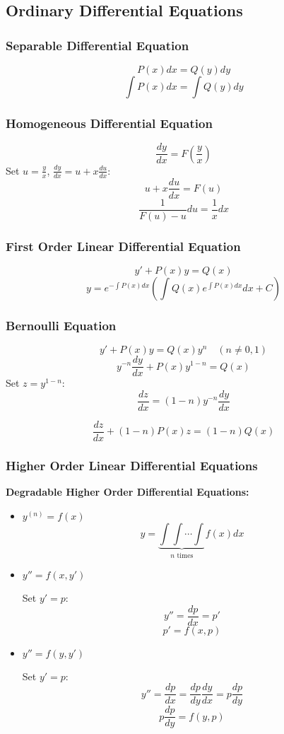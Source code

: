 \documentclass{article}
\begin{document}
\subsection{Ordinary Differential Equations}

\subsubsection{Separable Differential Equation}

\[
    P(x) dx = Q(y) dy
\]
\[
    \int P(x) dx = \int Q(y) dy
\]

\subsubsection{Homogeneous Differential Equation}

\[
    \frac{dy}{dx} = F\left(\frac{y}{x}\right)
\]
Set $u = \frac{y}{x}$, $\frac{dy}{dx} = u + x\frac{du}{dx}$:
\[
    u + x\frac{du}{dx} = F(u)
\]
\[
    \frac{1}{F(u) - u} du = \frac{1}{x} dx
\]

\subsubsection{First Order Linear Differential Equation}

\[
    y' + P(x)y = Q(x)
\]
\[
    y = e^{-\int P(x) dx} \left(\int Q(x) e^{\int P(x) dx} dx + C\right)
\]

\subsubsection{Bernoulli Equation}

\[
    y' + P(x)y = Q(x)y^n \quad (n \neq 0, 1)
\]
\[
    y^{-n} \frac{dy}{dx} + P(x) y^{1-n} = Q(x)
\]
Set $z = y^{1-n}$:
\[
    \frac{dz}{dx} = (1-n) y^{-n} \frac{dy}{dx}
\]

\[
    \frac{dz}{dx} + (1-n)P(x)z = (1-n)Q(x)
\]

\subsubsection{Higher Order Linear Differential Equations}

\textbf{Degradable Higher Order Differential Equations:}

\begin{itemize}
    \item $y^{(n)} = f(x)$
    \[
        y = \underbrace{\int \int \cdots \int}_{n \text{ times}} f(x) dx
    \]

    \item $y'' = f(x, y')$

    Set $y' = p$:
    \[
        y'' = \frac{dp}{dx} = p'
    \]
    \[
        p' = f(x, p)
    \]

    \item $y'' = f(y, y')$

    Set $y' = p$:
    \[
        y'' = \frac{dp}{dx} = \frac{dp}{dy} \frac{dy}{dx} = p \frac{dp}{dy}
    \]
    \[
        p \frac{dp}{dy} = f(y, p)
    \]
\end{itemize}
\end{document}
